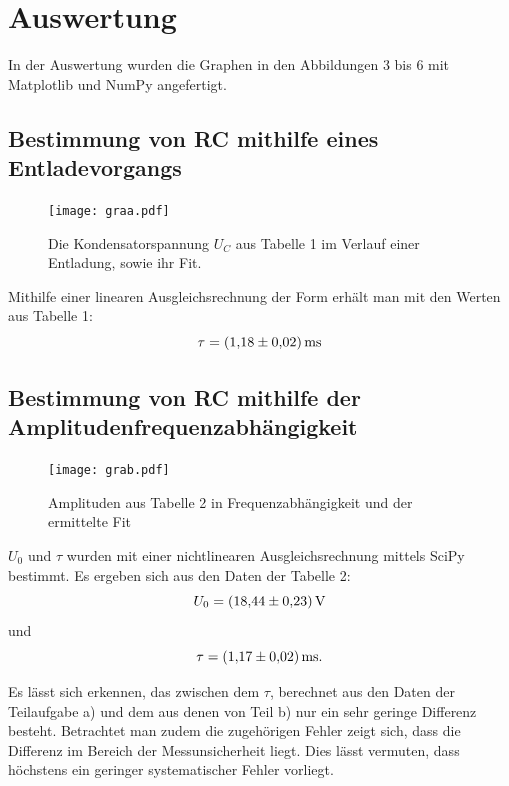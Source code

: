 \section{Auswertung}
\label{sec:Auswertung}
In der Auswertung wurden die Graphen in den Abbildungen 3 bis 6 mit Matplotlib \cite{matplotlib} und NumPy \cite{numpy} angefertigt.

\subsection{Bestimmung von RC mithilfe eines Entladevorgangs}
\begin{figure}[H]
	\centering
	\caption{Die Kondensatorspannung $U_C$ aus Tabelle 1 im Verlauf einer Entladung, sowie ihr Fit.}
	\texttt{[image: graa.pdf]}
	\label{fig:graa}
\end{figure}


Mithilfe einer linearen Ausgleichsrechnung der Form  erhält man mit den Werten aus Tabelle 1:
\begin{displaymath}
\tau = \SI{1.18 \pm 0.02}{\milli\second}
\end{displaymath}
\subsection{Bestimmung von RC mithilfe der Amplitudenfrequenzabhängigkeit}
\begin{figure}[H]
	\centering
	\caption{Amplituden aus Tabelle 2 in Frequenzabhängigkeit und der ermittelte Fit}
	\texttt{[image: grab.pdf]}
	\label{fig:grab}
\end{figure}

$U_0$ und $\tau$ wurden mit einer nichtlinearen Ausgleichsrechnung mittels SciPy \cite{scipy} bestimmt. Es ergeben sich aus den Daten der Tabelle 2:
\begin{displaymath}
U_0 = \SI{18.44 \pm 0.23}{\volt}
\end{displaymath}
und
\begin{displaymath}
\tau = \SI{1.17 \pm 0.02}{\milli\second}\text{.}
\end{displaymath}

Es lässt sich erkennen, das zwischen dem $\tau$, berechnet aus den Daten der
 Teilaufgabe a) und dem aus denen von Teil b) nur ein sehr geringe Differenz
  besteht. Betrachtet man zudem die zugehörigen Fehler zeigt sich, dass die
	Differenz im Bereich der Messunsicherheit liegt. Dies lässt vermuten, dass höchstens ein geringer systematischer Fehler vorliegt.

